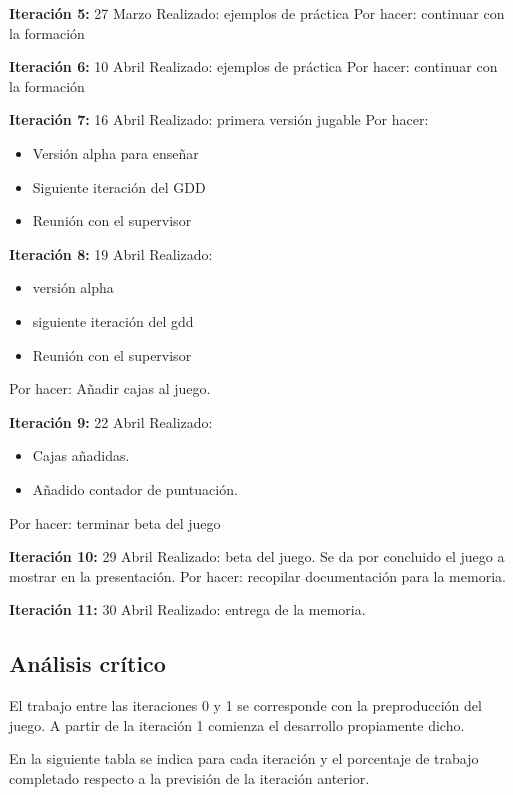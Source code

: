 \documentclass[12 pt, a4paper, twoside]{article}
\begin{document}
\textbf{Iteración 5:}
27 Marzo
Realizado: ejemplos de práctica
Por hacer: continuar con la formación

\textbf{Iteración 6:}
10 Abril
Realizado: ejemplos de práctica
Por hacer: continuar con la formación

\textbf{Iteración 7:}
16 Abril
Realizado: primera versión jugable
Por hacer:
\begin{itemize}
\item Versión alpha para enseñar
\item Siguiente iteración del GDD
\item Reunión con el supervisor
\end{itemize}

\textbf{Iteración 8:}
19 Abril
Realizado:
\begin{itemize}
\item versión alpha
\item siguiente iteración del gdd
\item Reunión con el supervisor
\end{itemize}
Por hacer: Añadir cajas al juego.

\textbf{Iteración 9:}
22 Abril
Realizado:
\begin{itemize}
\item Cajas añadidas.
\item Añadido contador de puntuación.
\end{itemize}
Por hacer: terminar beta del juego

\textbf{Iteración 10:}
29 Abril
Realizado: beta del juego. Se da por concluido el juego a mostrar en
la presentación.
Por hacer: recopilar documentación para la memoria.

\textbf{Iteración 11:}
30 Abril
Realizado: entrega de la memoria.

\subsection{Análisis crítico}
El trabajo entre las iteraciones 0 y 1 se corresponde con la
preproducción del juego. A partir de la iteración 1 comienza el
desarrollo propiamente dicho.

En la siguiente tabla se indica para cada iteración y el porcentaje de trabajo completado
respecto a la previsión de la iteración anterior.
\end{document}
